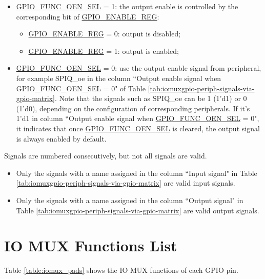 \documentclass[main\_\_EN.tex]{subfiles}
\begin{document}
\begin{itemize}
    \item \hyperref[fielddesc:GPIOFUNCNOENSEL]{GPIO\_FUNC\_OEN\_SEL} = 1: the output enable is controlled by the corresponding bit  of \hyperref[regdesc:GPIOENABLEREG]{GPIO\_ENABLE\_REG}:
    \begin{itemize}
        \item \hyperref[regdesc:GPIOENABLEREG]{GPIO\_ENABLE\_REG} = 0: output is disabled;
        \item \hyperref[regdesc:GPIOENABLEREG]{GPIO\_ENABLE\_REG} = 1: output is enabled;
    \end{itemize}
    \item \hyperref[fielddesc:GPIOFUNCNOENSEL]{GPIO\_FUNC\_OEN\_SEL} = 0: use the output enable signal from peripheral, for example SPIQ\_oe in the column ``Output enable signal when GPIO\_FUNC\_OEN\_SEL = 0" of Table \ref{tab:iomuxgpio-periph-signals-via-gpio-matrix}. Note that the signals such as SPIQ\_oe can be 1 (1'd1) or 0 (1'd0), depending on the configuration of corresponding peripherals. If it's 1'd1 in column ``Output enable signal when \hyperref[fielddesc:GPIOFUNCNOENSEL]{GPIO\_FUNC\_OEN\_SEL} = 0", it indicates that once  \hyperref[fielddesc:GPIOFUNCNOENSEL]{GPIO\_FUNC\_OEN\_SEL} is cleared, the output signal is always enabled by default.
\end{itemize}

\begin{tiplisting}
Signals are numbered consecutively, but not all signals are valid.
\vspace{-1em}
\begin{itemize}
    \item Only the signals with a name assigned in the column ``Input signal" in Table \ref{tab:iomuxgpio-periph-signals-via-gpio-matrix} are valid input signals.
    \item Only the signals with a name assigned in the column ``Output signal" in Table \ref{tab:iomuxgpio-periph-signals-via-gpio-matrix} are valid output signals.
\end{itemize}
\end{tiplisting}

\begin{landscape}



\end{landscape}
\section{IO MUX Functions List}
\label{sec:iomux_pads}
Table \ref{table:iomux_pads} shows the IO MUX functions of each GPIO pin.
\end{document}
